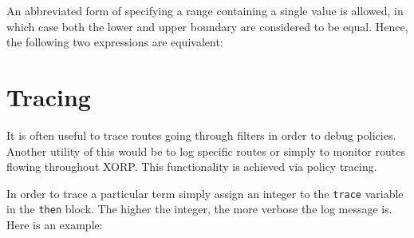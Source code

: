 \noindent{}

An abbreviated form of specifying a range containing a single value is allowed, in which case both the lower and upper boundary are considered to be equal.  Hence, the following two expressions are equivalent:

\noindent{}

\section{Tracing}
It is often useful to trace routes going through filters in order to debug
policies.  Another utility of this would be to log specific routes or simply to
monitor routes flowing throughout XORP.  This functionality is achieved via policy
tracing.

In order to trace a particular term simply assign an integer to the {\tt trace}
variable in the {\tt then} block.  The higher the integer, the more verbose the
log message is.  Here is an example:

\noindent{}

